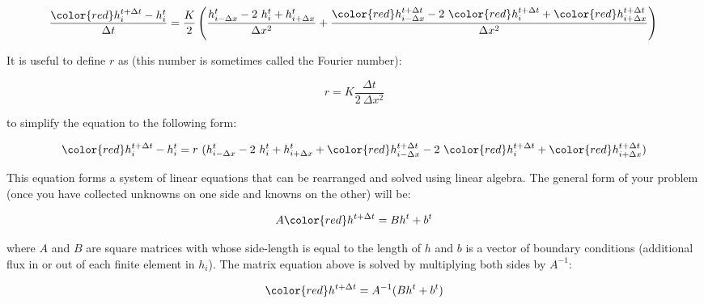 \begin{equation*}
	\dfrac{{\color{red}h_{i}^{t+\Delta t}}
	- h_i^t}{\Delta t}
	=
	\dfrac{K}{2}
	\left(
	\dfrac{
		h_{i-\Delta x}^{t}
		-
		2~h_{i}^{t}
		+
		h_{i+\Delta x}^{t}
	}
	{
		\Delta x^2
	}
	+
	\dfrac{
		{\color{red}
			h_{i-\Delta x}^{t+\Delta t}
		}
		-
		2~{\color{red}
			h_{i}^{t+\Delta t}
		}
		+
		{\color{red}
			h_{i+\Delta x}^{t+\Delta t}
		}
	}
	{
		\Delta x^2
	}
	\right)
	\\
\end{equation*}


\noindent It is useful to define $r$ as (this number is sometimes called the Fourier number):


\begin{equation*}
	r=K\dfrac{\Delta t}{2~\Delta x^2}
	\tag{Fourier number}
\end{equation*}


\noindent to simplify the equation to the following form:


\begin{equation*}
	{\color{red}h_{i}^{t+\Delta t}}
	-
	h_i^t
	=
	r~(h_{i-\Delta x}^{t}
	-
	2~h_{i}^{t}
	+
	h_{i+\Delta x}^{t}
	+
	{\color{red}
	h_{i-\Delta x}^{t+\Delta t}}
	-
	2~{\color{red}h_{i}^{t+\Delta t}}
	+
	{\color{red}h_{i+\Delta x}^{t+\Delta t}})
	\\
\end{equation*}


\noindent This equation forms a system of linear equations that can be rearranged and solved using linear algebra. The general form of your problem (once you have collected unknowns on one side and knowns on the other) will be:



\begin{equation*}
	A
	{\color{red}h^{t+\Delta t} }
	=
	Bh^{t}
	+
	b^{t}
\end{equation*}


\noindent where $A$ and $B$ are square matrices with whose side-length is equal to the length of $h$ and $b$ is a vector of boundary conditions (additional flux in or out of each finite element in $h_i$). The matrix equation above is solved by multiplying both sides by $A^{-1}$:


\begin{equation*}
	{\color{red}h^{t+\Delta t} }
	=
	A^{-1}(Bh^{t}
	+
	b^{t})
\end{equation*}

